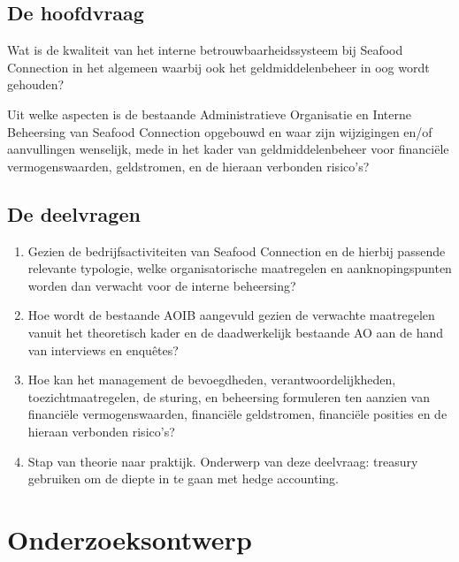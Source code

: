 \documentclass[10pt,a4paper,oneside]{report}
\begin{document}
    \section{De hoofdvraag}
\textnormal{\large{Wat is de kwaliteit van het interne betrouwbaarheidssysteem bij Seafood Connection in het algemeen waarbij ook het geldmiddelenbeheer in oog wordt gehouden?}}

\bigskip
\noindent
\color{red}
Uit welke aspecten is de bestaande Administratieve Organisatie en Interne Beheersing van Seafood Connection opgebouwd en waar zijn wijzigingen en/of aanvullingen wenselijk, mede in het kader van geldmiddelenbeheer voor financiële vermogenswaarden, geldstromen, en de hieraan verbonden risico's?
\color{black}

    \section{De deelvragen}
\begin{enumerate}
    \item Gezien de bedrijfsactiviteiten van Seafood Connection en de hierbij passende relevante typologie, welke organisatorische maatregelen en aanknopingspunten worden dan verwacht voor de interne beheersing?
    \item Hoe wordt de bestaande AOIB aangevuld gezien de verwachte maatregelen vanuit het theoretisch kader en de daadwerkelijk bestaande AO aan de hand van interviews en enquêtes?
    \item Hoe kan het management de bevoegdheden, verantwoordelijkheden, toezichtmaatregelen, de sturing, en beheersing formuleren ten aanzien van financiële vermogenswaarden, financiële geldstromen, financiële posities en de hieraan verbonden risico’s?
    \color{red} \item Stap van theorie naar praktijk. Onderwerp van deze deelvraag: treasury gebruiken om de diepte in te gaan met hedge accounting. 
    \color{black}
\end{enumerate}

\chapter{Onderzoeksontwerp}
\end{document}
